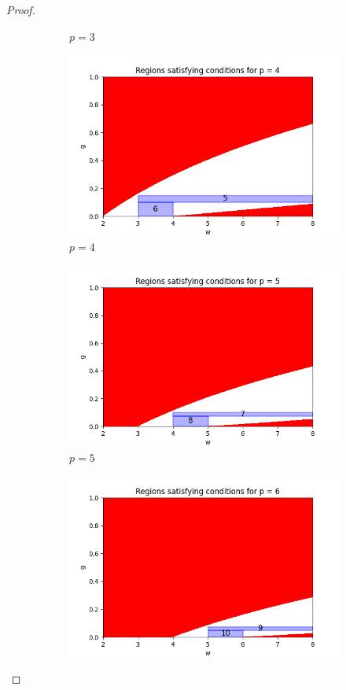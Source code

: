 \documentclass{article}
\begin{document}
\begin{proof}
\begin{figure}[ht]
\begin{subfigure}{0.32\textwidth}
        \caption{$p = 3$}
    \end{subfigure}
    \hfill
    \begin{subfigure}{0.32\textwidth}
        \includegraphics[width=\linewidth]{plotsexcom/plot_p_4.png}
        \caption{$p = 4$}
    \end{subfigure}
    \hfill
    \begin{subfigure}{0.32\textwidth}
       \includegraphics[width=\linewidth]{plotsexcom/plot_p_5.png}
        \caption{$p = 5$}
    \end{subfigure}
    \medskip
    \begin{subfigure}{0.32\textwidth}
        \includegraphics[width=\linewidth]{plotsexcom/plot_p_6.png}

\end{subfigure}
\end{figure}
\end{proof}
\end{document}
